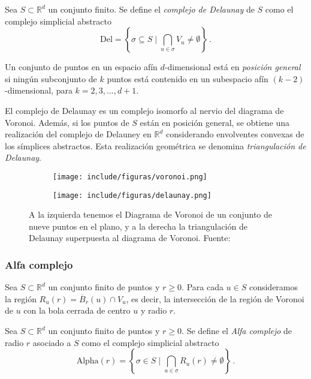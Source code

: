 \begin{definition}
Sea $S \subset \mathbb{R}^d$ un conjunto finito. Se define el \emph{complejo de Delaunay} de $S$ como el complejo simplicial abstracto 
\[
\text{Del} = \left\{\sigma \subseteq S \mid \bigcap_{u \in \sigma}V_u \neq \emptyset \right\}\,.
\] 
\end{definition}

\begin{definition}
Un conjunto de puntos en un espacio afín $d$-dimensional está en \emph{posición general} si ningún subconjunto de $k$ puntos está contenido en un subespacio afín $(k-2)$-dimensional, para $k = 2, 3, ..., d + 1$.
\end{definition}


El complejo de Delaunay es un complejo isomorfo al nervio del diagrama de Voronoi. Además, si los puntos de $S$ están en posición general, se obtiene una realización del complejo de Delauney en $\mathbb{R}^d$ considerando envolventes convexas de los símplices abstractos. Esta realización geométrica se denomina \emph{triangulación de Delaunay}.

\begin{figure}[!ht]
\centering
\begin{subfigure}[b]{0.4\textwidth}
	\centering
	\texttt{[image: include/figuras/voronoi.png]} 
\end{subfigure}
\begin{subfigure}[b]{0.4\textwidth}
	\centering
	\texttt{[image: include/figuras/delaunay.png]} 
\end{subfigure}
\caption{A la izquierda tenemos el Diagrama de Voronoi de un conjunto de nueve puntos en el plano, y a la derecha la triangulación de Delaunay superpuesta al diagrama de Voronoi. Fuente: \cite{libroEH}}
\label{ref:vor-del}
\end{figure}

\subsubsection*{Alfa complejo}
Sea $S \subset \mathbb{R}^d$ un conjunto finito de puntos y $r \geq 0$. Para cada $u \in S$ consideramos la región $R_u(r)= \overline{B}_r(u) \cap V_u$, es decir, la intersección de la región de Voronoi de $u$ con la bola cerrada de centro $u$ y radio $r$.

\begin{definition}
Sea $S \subset \mathbb{R}^d$ un conjunto finito de puntos y $r \geq 0$. Se define el \emph{Alfa complejo} de radio $r$ asociado a $S$ como el complejo simplicial abstracto
\[
\text{Alpha}(r)=\left\{\sigma \in S \mid \bigcap_{u \in \sigma}R_u(r) \neq \emptyset \right\}\,.
\]
\end{definition}

